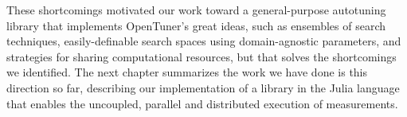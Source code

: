 These shortcomings motivated our work toward a general-purpose autotuning
library that implements OpenTuner's great ideas, such as ensembles of
search techniques, easily-definable search spaces using domain-agnostic
parameters, and strategies for sharing computational resources, but that solves
the shortcomings we identified. The next chapter summarizes the work
we have done is this direction so far, describing our implementation of
a library in the Julia language that enables the uncoupled, parallel
and distributed execution of measurements.
